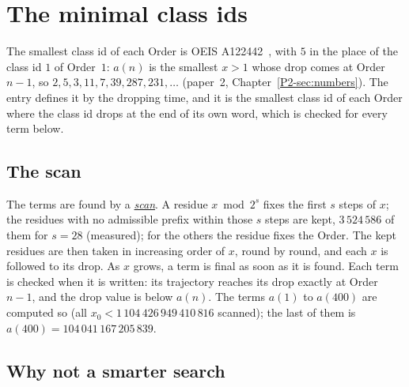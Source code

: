 \documentclass[10pt,a4paper,titlepage]{article}
\makeatletter
\newcommand{\termhere}[1]{\leavevmode
  \Hy@raisedlink{\hyper@anchorstart{term:#1}\hyper@anchorend}}
\newcommand{\keyterm}[2]{\hyperlink{box:#1}{\emph{#2}}}
\makeatother
\begin{document}
\section{The minimal class ids}
\label{sec:minimal}

The smallest class id of each Order is OEIS A122442~\cite{OEIS_A122442}, with $5$ in the place of the class id
$1$ of Order~$1$: $a(n)$ is the smallest $x > 1$ whose drop comes at Order $n - 1$, so
$2, 5, 3, 11, 7, 39, 287, 231, \dots$ (paper~2, Chapter~\ref{P2-sec:numbers}). The entry
defines it by the dropping time, and it is the smallest class id of each Order where the
class id drops at the end of its own word, which is checked for every term below.

\subsection*{The scan}

\termhere{scan}The terms are found by a \keyterm{scan}{scan}. A
residue $x \bmod 2^s$ fixes the first $s$ steps of $x$; the residues with no admissible prefix within
those $s$ steps are kept, $3\,524\,586$ of them for $s = 28$ (measured); for the others the residue fixes
the Order. The kept
residues are then taken in increasing order of $x$, round by round, and each $x$ is followed
to its drop. As $x$ grows, a term is final as soon as it is found. Each term is checked when
it is written: its trajectory reaches its drop exactly at Order $n - 1$, and the drop value
is below $a(n)$. The terms $a(1)$ to $a(400)$ are computed so (all $x_0 < 1\,104\,426\,949\,410\,816$
scanned); the last of them is $a(400) = 104\,041\,167\,205\,839$.

\subsection*{Why not a smarter search}
\end{document}
